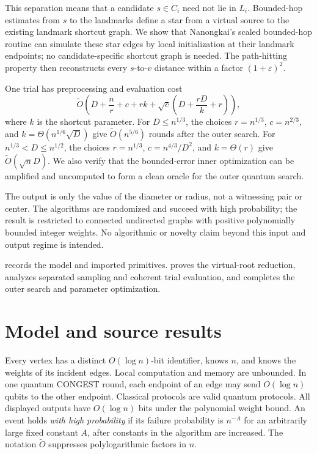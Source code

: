 \documentclass[11pt]{article}
\theoremstyle{definition}
\newcommand{\eps}{\varepsilon}
\newcommand{\wtO}{\widetilde O}
\begin{document}
This separation means that a candidate $s\in C_i$ need not lie in $L_i$.
Bounded-hop estimates from $s$ to the landmarks define a star from a virtual
source to the existing landmark shortcut graph.  We show that Nanongkai's
scaled bounded-hop routine can simulate these star edges by local
initialization at their landmark endpoints; no candidate-specific shortcut
graph is needed.  The path-hitting property then reconstructs every
$s$-to-$v$ distance within a factor $(1+\eps)^2$.

One trial has preprocessing and evaluation cost
\[
  \wtO\!\left(
    D+\frac nr+c+rk
    +\sqrt c\left(D+\frac{rD}{k}+r\right)
  \right),
  \tag{1}\label{eq:trial-intro}
\]
where $k$ is the shortcut parameter.  For $D\leq n^{1/3}$, the choices
$r=n^{1/3}$, $c=n^{2/3}$, and $k=\Theta(n^{1/6}\sqrt D)$ give
$\wtO(n^{5/6})$ rounds after the outer search.  For
$n^{1/3}<D\leq n^{1/2}$, the choices $r=n^{1/3}$,
$c=n^{4/3}/D^2$, and $k=\Theta(r)$ give
$\wtO(\sqrt nD)$.  We also verify that the bounded-error inner optimization
can be amplified and uncomputed to form a clean oracle for the outer quantum
search.

The output is only the value of the diameter or radius, not a witnessing pair
or center.  The algorithms are randomized and succeed with high probability;
the result is restricted to connected undirected graphs with positive
polynomially bounded integer weights.  No algorithmic or novelty claim beyond
this input and output regime is intended.

 records the model and imported primitives.
 proves the virtual-root reduction,
 analyzes separated sampling and coherent trial
evaluation, and  completes the outer search and parameter
optimization.

\section{Model and source results}
\label{sec:preliminaries}

Every vertex has a distinct $O(\log n)$-bit identifier, knows $n$, and knows
the weights of its incident edges.  Local computation and memory are
unbounded.  In one quantum CONGEST round, each endpoint of an edge may send
$O(\log n)$ qubits to the other endpoint.
Classical protocols are valid quantum protocols.  All displayed outputs have
$O(\log n)$ bits under the polynomial weight bound.  An event holds \emph{with
high probability} if its failure probability is $n^{-A}$ for an arbitrarily
large fixed constant $A$, after constants in the algorithm are increased.
The notation $\wtO$ suppresses polylogarithmic factors in $n$.
\end{document}
